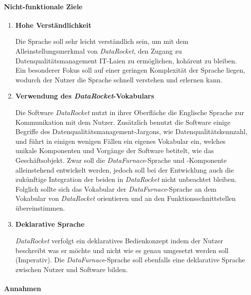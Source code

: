 \documentclass[
  language=german, %
  type=bachelor,%
  ngerman
]{isthesis}
\begin{document}
\begin{content}
  \paragraph{Nicht-funktionale Ziele}
    \begin{enumerate}
      \item \textbf{Hohe Verständlichkeit}\label{item:hohe-verstaendlichkeit}

				Die Sprache soll sehr leicht verständlich sein, um mit dem
				Alleinstellungsmerkmal von \textit{DataRocket}, den Zugang zu
				Datenqualitätsmanagement IT-Laien zu ermöglichen, kohärent zu bleiben.
				Ein besonderer Fokus soll auf einer geringen Komplexität der Sprache
				liegen, wodurch der Nutzer die Sprache schnell verstehen und erlernen
				kann.

      \item \textbf{Verwendung des \textit{DataRocket}-Vokabulars}

				Die Software \textit{DataRocket} nutzt in ihrer Oberfläche die
				Englische Sprache zur Kommunikation mit dem Nutzer. Zusätzlich benutzt
				die Software einige Begriffe des Datenqualitätsmanagement-Jargons, wie
				\zB{} Datenqualitätskennzahl, und führt in einigen wenigen Fällen ein
				eigenes Vokabular ein, welches unikale Komponenten und Vorgänge der
				Software betitelt, wie \zB{} das Geschäftsobjekt. Zwar soll die
				\textit{DataFurnace}-Sprache und -Komponente alleinstehend entwickelt
				werden, jedoch soll bei der Entwicklung auch die zukünftige Integration
				der beiden in \textit{DataRocket} nicht unbeachtet bleiben. Folglich
				sollte sich das Vokabular der \textit{DataFurnace}-Sprache an dem
				Vokabular von \textit{DataRocket} orientieren und an den
				Funktionsschnittstellen übereinstimmen.

			\item \textbf{Deklarative Sprache}
				
				\textit{DataRocket} verfolgt ein deklaratives Bedienkonzept indem der
				Nutzer beschreibt was er möchte und nicht wie es genau umgesetzt werden
				soll (Imperativ). Die \textit{DataFurnace}-Sprache soll ebenfalls eine
				deklarative Sprache zwischen Nutzer und Software bilden.

    \end{enumerate}

	\paragraph{Annahmen} 


\end{content}
\end{document}
